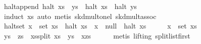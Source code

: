 \begin{isabellebody}
\isanewline
{}\isamarkupfalse%
\ halt{}append{}\ {}halt\ {}xs\ {}\ ys{}\ {}\ halt\ xs\ {}\ halt\ ys{}\isanewline
%
\isadelimproof
\ \ %
\endisadelimproof
%
\isatagproof
{}\isamarkupfalse%
\ {}induct\ xs{}\ auto{}\ {}metis\ skd{}mult{}onel\ skd{}mult{}assoc{}{}{}%
\endisatagproof
{\isafoldproof}%
%
\isadelimproof
\isanewline
%
\endisadelimproof
\isanewline
{}\isamarkupfalse%
\ halt{}set{}\ {}x\ {}\ set\ xs\ {}\ halt\ xs\ {}\ x\ {}{}\ null\ {}\ halt\ xs{}\isanewline
%
\isadelimproof
%
\endisadelimproof
%
\isatagproof
{}\isamarkupfalse%
\ {}\isanewline
\ \ \isamarkupfalse%
\ {}x\ {}\ set\ xs{}\isanewline
\ \ \isamarkupfalse%
\ \isamarkupfalse%
\ ys\ \ zs\ \ xs{}split{}\ {}xs\ {}\ ys\ {}\ x{}zs{}\isanewline
\ \ \ \ \isamarkupfalse%
\ {}metis\ {}lifting{}\ split{}list{}first{}\isanewline
\ \ \isamarkupfalse%

\end{isabellebody}

